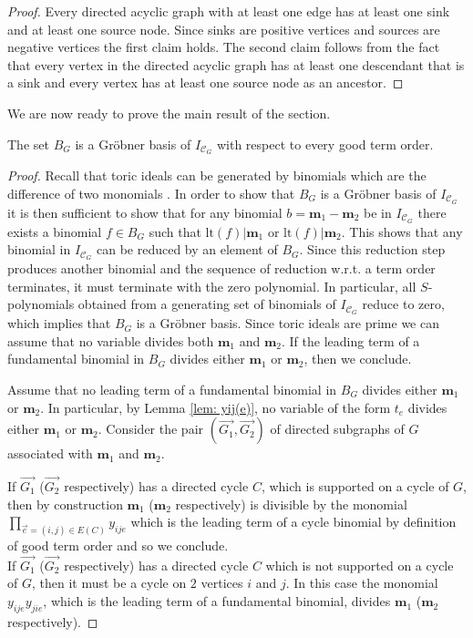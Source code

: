 \begin{proof}
Every directed acyclic graph with at least one edge has at least one sink and at least one source node.  Since sinks are positive vertices and sources are negative vertices the first claim holds.  The second claim follows from the fact that every vertex in the directed acyclic graph has at least one descendant that is a sink and every vertex has at least one source node as an ancestor.
\end{proof}
We are now ready to prove the main result of the section.
\begin{theo}
\label{thm: gb}
    The set $B_G$ is a Gr\"{o}bner basis of $I_{\mathcal{C}_G}$ with respect to every good term order.
\end{theo}
\begin{proof}
     Recall that toric ideals can be generated by binomials which are the difference of two monomials \cite[Theorem 3.2]{binomial}. In order to show that $B_G$ is a Gr\"{o}bner basis of $I_{\mathcal{C}_G}$ it is then sufficient to show that for any binomial $b = \mathbf{m}_1 - \mathbf{m}_2$ be in $I_{\mathcal{C}_G}$ there exists a binomial $f\in B_G$ such that $\text{lt}(f)| \mathbf{m}_1$ or $\text{lt}(f)| \mathbf{m}_2$. This shows that any binomial in $I_{\mathcal{C}_G}$ can be reduced by an element of $B_G$. Since this reduction step produces another binomial and the sequence of reduction w.r.t. a term order terminates, it must terminate with the zero polynomial. In particular, all $S$-polynomials obtained from  a generating set of binomials of $I_{\mathcal{C}_G}$ reduce to zero, which implies that $B_G$ is a Gr\"{o}bner basis.
     Since toric ideals are prime we can assume that no variable divides both $\mathbf{m}_1$ and $\mathbf{m}_2$.
     If the leading term of a fundamental binomial in $B_G$ divides either $\mathbf{m}_1$ or $\mathbf{m}_2$, then we conclude.
     
     Assume that no leading term of a fundamental binomial in $B_G$ divides either $\mathbf{m}_1$ or $\mathbf{m}_2$. In particular, by Lemma \ref{lem: yij(e)}, no variable of the form $t_{e}$ divides either $\mathbf{m}_1$ or $\mathbf{m}_2$. Consider the pair $(\overrightarrow{G_1},\overrightarrow{G_2})$ of directed subgraphs of $G$ associated with $\mathbf{m}_1$ and $\mathbf{m}_2$.
     
If $\overrightarrow{G_1}$ ($\overrightarrow{G_2}$ respectively) has a directed cycle $C$, which is supported on a cycle of $G$, then  by construction $\mathbf{m}_1$ ($\mathbf{m}_2$ respectively) is divisible by the monomial $\prod_{\overset{\to}{e}=(i,j)\in E(C)}y_{ije}$ which is the leading term of a cycle binomial by definition of good term order and so we conclude.\\
If $\overrightarrow{G_1}$ ($\overrightarrow{G_2}$ respectively) has a directed cycle $C$ which is not supported on a cycle of $G$, then it must be a cycle on $2$ vertices $i$ and $j$. In this case the monomial $y_{ije}y_{jie}$, which is the leading term of a fundamental binomial, divides $\mathbf{m}_1$ ($\mathbf{m}_2$ respectively).
     

\end{proof}

